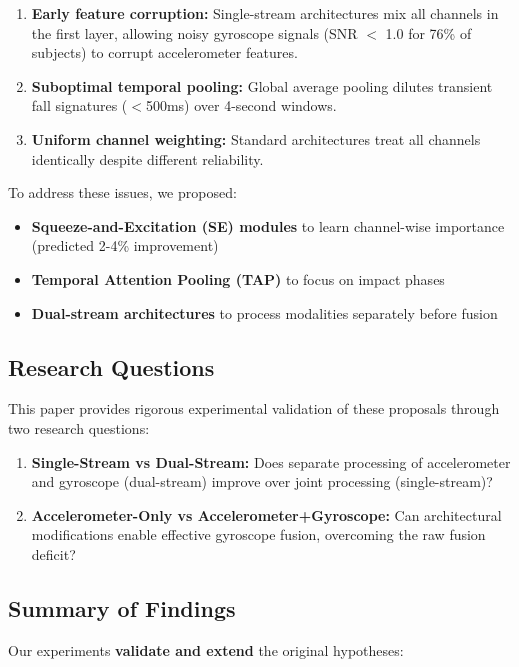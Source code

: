 \documentclass{article}
\begin{document}
\begin{enumerate}[label=\textbf{H\arabic*:}]
    \item \textbf{Early feature corruption:} Single-stream architectures mix all channels in the first layer, allowing noisy gyroscope signals (SNR $<$ 1.0 for 76\% of subjects) to corrupt accelerometer features.
    \item \textbf{Suboptimal temporal pooling:} Global average pooling dilutes transient fall signatures ($<$500ms) over 4-second windows.
    \item \textbf{Uniform channel weighting:} Standard architectures treat all channels identically despite different reliability.
\end{enumerate}

To address these issues, we proposed:
\begin{itemize}
    \item \textbf{Squeeze-and-Excitation (SE) modules} to learn channel-wise importance (predicted 2-4\% improvement)
    \item \textbf{Temporal Attention Pooling (TAP)} to focus on impact phases
    \item \textbf{Dual-stream architectures} to process modalities separately before fusion
\end{itemize}

\subsection{Research Questions}

This paper provides rigorous experimental validation of these proposals through two research questions:

\begin{enumerate}[label=\textbf{RQ\arabic*:}]
    \item \textbf{Single-Stream vs Dual-Stream:} Does separate processing of accelerometer and gyroscope (dual-stream) improve over joint processing (single-stream)?
    \item \textbf{Accelerometer-Only vs Accelerometer+Gyroscope:} Can architectural modifications enable effective gyroscope fusion, overcoming the raw fusion deficit?
\end{enumerate}

\subsection{Summary of Findings}

Our experiments \textbf{validate and extend} the original hypotheses:
\end{document}
